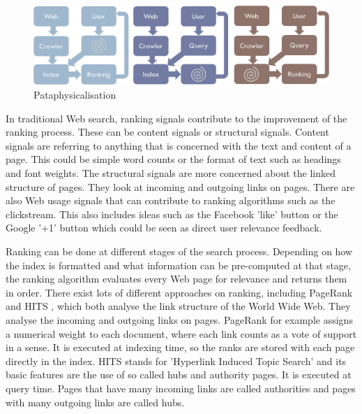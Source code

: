 
\begin{figure}[!htb] %
  \centering
  \includegraphics[width=\textwidth]{images/patasearch02}
\caption[Pataphysicalisation]{Pataphysicalisation}
\label{fig:patasearch02}
\end{figure}

In traditional Web search, ranking signals contribute to the improvement of the ranking process. These can be content signals or structural signals. Content signals are referring to anything that is concerned with the text and content of a page. This could be simple word counts or the format of text such as headings and font weights. The structural signals are more concerned about the linked structure of pages. They look at incoming and outgoing links on pages. There are also Web usage signals that can contribute to ranking algorithms such as the clickstream. This also includes ideas such as the Facebook 'like' button or the Google '+1' button which could be seen as direct user relevance feedback.

Ranking can be done at different stages of the search process. Depending on how the index is formatted and what information can be pre-computed at that stage, the ranking algorithm evaluates every Web page for relevance and returns them in order. There exist lots of different approaches on ranking, including PageRank \citep{Brin1998} and HITS \citep{Kleinberg1999}, which both analyse the link structure of the World Wide Web. They analyse the incoming and outgoing links on pages. PageRank for example assigns a numerical weight to each document, where each link counts as a vote of support in a sense. It is executed at indexing time, so the ranks are stored with each page directly in the index. HITS stands for 'Hyperlink Induced Topic Search' and its basic features are the use of so called hubs and authority pages. It is executed at query time. Pages that have many incoming links are called authorities and pages with many outgoing links are called hubs.

